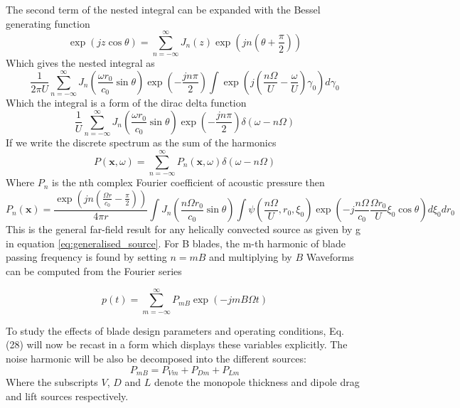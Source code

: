 \documentclass[8pt]{article}
\begin{document}
The second term of the nested integral can be expanded with the Bessel generating function
\begin{equation}
    \exp(jz\cos\theta) = \sum_{n=-\infty}^\infty J_n(z) \exp\left(jn\left(\theta + \frac{\pi}{2}\right)\right)
\end{equation}
Which gives the nested integral as
\begin{equation}
    \frac{1}{2\pi U} \sum_{n=-\infty}^\infty J_n\left(\frac{\omega r_0}{c_0} \sin \theta\right) \exp\left( -\frac{jn\pi}{2} \right)\int  \exp\left(
        j \left( \frac{n\Omega}{U} - \frac{\omega}{U} \right) \gamma_0\right) d\gamma_0
\end{equation}
Which the integral is a form of the dirac delta function
\begin{equation}
    \frac{1}{U} \sum_{n=-\infty}^\infty J_n\left(\frac{\omega r_0}{c_0} \sin \theta\right) \exp\left( -\frac{jn\pi}{2} \right) \delta\left( \omega - n\Omega \right)
\end{equation}
If we write the discrete spectrum as the sum of the harmonics
\begin{equation}
    P(\mathbf{x}, \omega) = \sum_{n=-\infty}^\infty P_n(\mathbf{x}, \omega) \delta \left( \omega - n\Omega \right)
\end{equation}
Where $P_n$ is the nth complex Fourier coefficient of acoustic pressure then
\begin{equation}
        P_n(\mathbf{x}) = \frac{\exp\left(jn \left( \frac{\Omega r}{c_0} - \frac{\pi}{2} \right)\right)}{4\pi r} 
        \int J_n\left(\frac{n\Omega r_0}{c_0} \sin \theta\right)
        \int \psi\left(\frac{n\Omega}{U}, r_0, \xi_0\right) 
        \exp\left(-j \frac{n\Omega}{c_0} \frac{\Omega r_0}{U} \xi_0 \cos\theta\right)
         d\xi_0 dr_0
         \label{eq:fourier_coefficient}
\end{equation}
This is the general far-field result for any helically convected source as given by g in equation \ref{eq:generalised_source}.
For B blades, the m-th harmonic of blade passing
frequency is found by setting $n = mB$ and multiplying by $B$
Waveforms can be computed from the Fourier series

\begin{equation}
    p(t) = \sum_{m=-\infty}^\infty P_{mB} \exp(-jmB\Omega t)
\end{equation}

To study the effects of blade design parameters and
operating conditions, Eq. (28) will now be recast in a form
which displays these variables explicitly.
The noise harmonic will be also be decomposed into the different sources:
\begin{equation}
    P_{mB} = P_{Vm} + P_{Dm} + P_{Lm}
\end{equation}
Where the subscripts $V$, $D$ and $L$ denote the monopole thickness and dipole drag and lift sources respectively.
\end{document}
